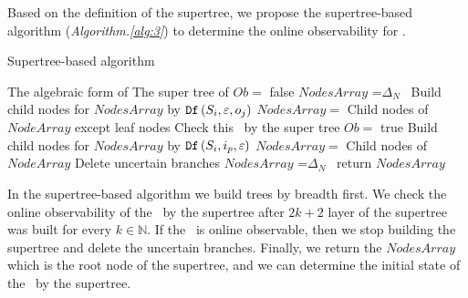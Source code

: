 Based on the definition of the supertree, we propose the supertree-based algorithm ({\em Algorithm.\ref{alg:3}}) to determine the online observability for \BCNs. 
\begin{algorithm}[h]
\caption{Supertree-based algorithm}
\begin{algorithmic}[1]
\REQUIRE 
The algebraic form of \BCN
\ENSURE  
The super tree of \BCN
\STATE  $Ob=$ false %
\STATE  $NodesArray$ =$\Delta_N$\
\STATE Build child nodes for $NodesArray$ by ${\tt Df}\left(S_i,\varepsilon, o_j\right)$
\STATE $NodesArray=$ Child nodes of $NodeArray$ except leaf nodes
\STATE Check this \BCN\ by the super tree
\STATE $Ob=$ true
\ELSE
\STATE Build child nodes for $NodesArray$ by ${\tt Df}\left(S_i,i_p,\varepsilon\right)$
\STATE $NodesArray=$ Child nodes of $NodeArray$
\ENDIF
\ENDWHILE
\STATE Delete uncertain branches
\STATE  $NodesArray$ =$\Delta_N$\
\STATE return $NodesArray$
\end{algorithmic}
 \label{alg:3}
\end{algorithm}

In the supertree-based algorithm we build trees by breadth first. We check the online observability of the \BCN\ by the supertree after $2k+2$ layer of the supertree was built for every $k\in  \mathbb{N}$. If the \BCN\ is online observable, then we stop building the supertree and delete the uncertain branches. Finally, we return the $NodesArray$ which is the root node of the supertree, and we can determine the initial state of the \BCN\ by the supertree.

